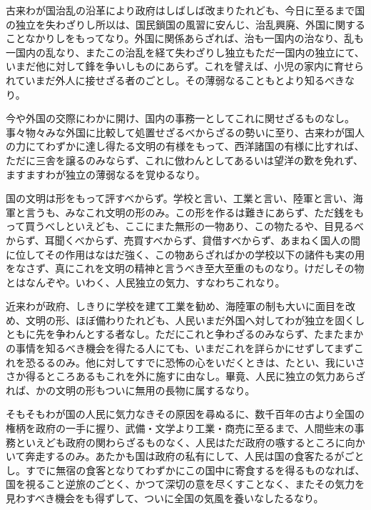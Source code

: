 \documentclass[a4paper, platex, dvipdfmx]{jsarticle}
\begin{document}
古来わが国治乱の沿革により政府はしばしば改まりたれども、今日に至るまで国の独立を失わざりし所以は、国民鎖国の風習に安んじ、治乱興廃、外国に関することなかりしをもってなり。外国に関係あらざれば、治も一国内の治なり、乱も一国内の乱なり、またこの治乱を経て失わざりし独立もただ一国内の独立にて、いまだ他に対して鋒を争いしものにあらず。これを譬えば、小児の家内に育せられていまだ外人に接せざる者のごとし。その薄弱なることもとより知るべきなり。

今や外国の交際にわかに開け、国内の事務一としてこれに関せざるものなし。事々物々みな外国に比較して処置せざるべからざるの勢いに至り、古来わが国人の力にてわずかに達し得たる文明の有様をもって、西洋諸国の有様に比すれば、ただに三舎を譲るのみならず、これに倣わんとしてあるいは望洋の歎を免れず、ますますわが独立の薄弱なるを覚ゆるなり。

国の文明は形をもって評すべからず。学校と言い、工業と言い、陸軍と言い、海軍と言うも、みなこれ文明の形のみ。この形を作るは難きにあらず、ただ銭をもって買うべしといえども、ここにまた無形の一物あり、この物たるや、目見るべからず、耳聞くべからず、売買すべからず、貸借すべからず、あまねく国人の間に位してその作用はなはだ強く、この物あらざればかの学校以下の諸件も実の用をなさず、真にこれを文明の精神と言うべき至大至重のものなり。けだしその物とはなんぞや。いわく、人民独立の気力、すなわちこれなり。

近来わが政府、しきりに学校を建て工業を勧め、海陸軍の制も大いに面目を改め、文明の形、ほぼ備わりたれども、人民いまだ外国へ対してわが独立を固くしともに先を争わんとする者なし。ただにこれと争わざるのみならず、たまたまかの事情を知るべき機会を得たる人にても、いまだこれを詳らかにせずしてまずこれを恐るるのみ。他に対してすでに恐怖の心をいだくときは、たとい、我にいささか得るところあるもこれを外に施すに由なし。畢竟、人民に独立の気力あらざれば、かの文明の形もついに無用の長物に属するなり。

そもそもわが国の人民に気力なきその原因を尋ぬるに、数千百年の古より全国の権柄を政府の一手に握り、武備・文学より工業・商売に至るまで、人間些末の事務といえども政府の関わらざるものなく、人民はただ政府の嗾するところに向かいて奔走するのみ。あたかも国は政府の私有にして、人民は国の食客たるがごとし。すでに無宿の食客となりてわずかにこの国中に寄食するを得るものなれば、国を視ること逆旅のごとく、かつて深切の意を尽くすことなく、またその気力を見わすべき機会をも得ずして、ついに全国の気風を養いなしたるなり。
\end{document}
